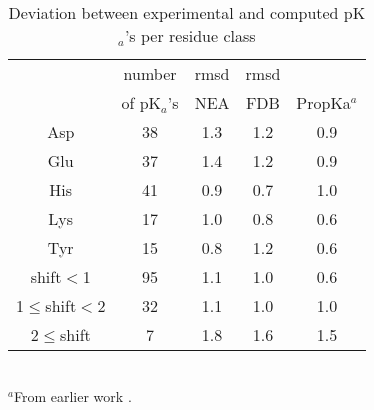 \documentclass[a4paper,12pt]{article}
\newcommand{\pk}{pK$_a$}
\begin{document}
\begin{table}[h]
\caption{Deviation between experimental and computed \pk's per residue class}
\label{tab:terrors}
\begin{center}
\begin{tabular}{ccccc} \hline
              & number   & rmsd & rmsd &     \\
              & of \pk's & NEA & FDB  & PropKa$^a$ \\ \hline
Asp	         & 38	 & 1.3 & 1.2  & 0.9 \\
Glu              & 37    & 1.4 & 1.2  & 0.9 \\
His              & 41	 & 0.9 & 0.7  & 1.0 \\
Lys              & 17	 & 1.0 & 0.8  & 0.6 \\
Tyr              & 15	 & 0.8 & 1.2  & 0.6 \\ \hline
shift$<$1        & 95	 & 1.1 & 1.0  & 0.6 \\
1$\leq$shift$<$2 & 32	 & 1.1 & 1.0  & 1.0 \\
2$\leq$shift     & 7	 & 1.8 & 1.6  & 1.5 \\ \hline
\end{tabular}
\\ {\footnotesize \noindent $^a$From earlier work \cite{Polydorides13}.}
\end{center}
\end{table}
\end{document}
